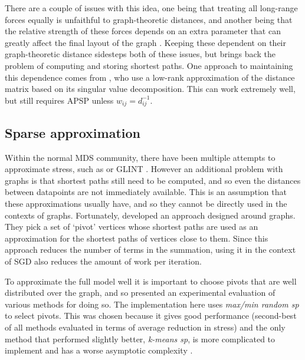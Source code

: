 There are a couple of issues with this idea, one being that treating all long-range forces equally is unfaithful to
graph-theoretic distances,
and another being that the relative strength of these forces depends on an extra parameter that can greatly affect the final layout of the graph \citep{Hu2005}.
Keeping these dependent on their graph-theoretic distance sidesteps both of these issues, but brings back the problem of computing and storing shortest paths. One approach to maintaining this dependence comes from \citet{Khoury2012}, who use a low-rank approximation of the distance matrix based on its singular value decomposition. This can work extremely well, but still requires APSP unless $w_{ij} = d_{ij}^{-1}$.

\subsection{Sparse approximation}
\label{sec:sparse_explanation}
Within the normal MDS community, there have been multiple attempts to approximate stress, such as \citet{Halko2011} or GLINT \citep{Ingram2012}. However an additional problem with graphs is that shortest paths still need to be computed, and so even the distances between datapoints are not immediately available. This is an assumption that these approximations usually have, and so they cannot be directly used in the contexts of graphs.
Fortunately, \citet{Ortmann2017} developed an approach designed around graphs. They pick a set of `pivot' vertices whose shortest paths are used as an approximation for the shortest paths of vertices close to them.
Since this approach reduces the number of terms in the summation, using it in the context of SGD also reduces the amount of work per iteration.

To approximate the full model well it is important to choose pivots that are well distributed over the graph, and so \citet{Ortmann2017} presented an experimental evaluation of various methods for doing so. The implementation here uses \emph{max/min random sp} to select pivots. This was chosen because it gives good performance (second-best of all methods evaluated in terms of average reduction in stress) and the only method that performed slightly better, \emph{k-means sp}, is more complicated to implement and has a worse asymptotic complexity \citep{Ortmann2017}.

